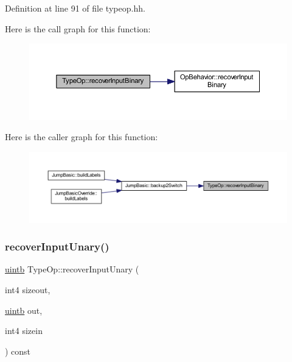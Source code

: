 Definition at line 91 of file typeop.\+hh.

Here is the call graph for this function\+:
\nopagebreak
\begin{figure}[H]
\begin{center}
\leavevmode
\includegraphics[width=350pt]{class_type_op_a2904d3cce4a93be9e976305779f57474_cgraph}
\end{center}
\end{figure}
Here is the caller graph for this function\+:
\nopagebreak
\begin{figure}[H]
\begin{center}
\leavevmode
\includegraphics[width=350pt]{class_type_op_a2904d3cce4a93be9e976305779f57474_icgraph}
\end{center}
\end{figure}
\mbox{\label{class_type_op_a33410aedda8e08db1eb3d0384e7d5130}} 
\subsubsection{\texorpdfstring{recoverInputUnary()}{recoverInputUnary()}}
{\footnotesize\ttfamily \mbox{\hyperlink{types_8h_a2db313c5d32a12b01d26ac9b3bca178f}{uintb}} Type\+Op\+::recover\+Input\+Unary (\begin{DoxyParamCaption}\item[{int4}]{sizeout,  }\item[{\mbox{\hyperlink{types_8h_a2db313c5d32a12b01d26ac9b3bca178f}{uintb}}}]{out,  }\item[{int4}]{sizein }\end{DoxyParamCaption}) const\hspace{0.3cm}{\ttfamily [inline]}}



